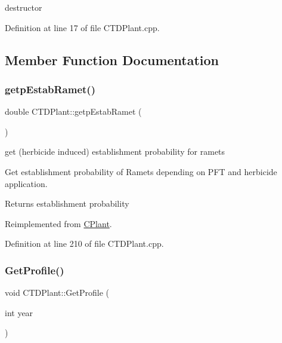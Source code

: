 destructor 

Definition at line 17 of file C\+T\+D\+Plant.\+cpp.



\subsection{Member Function Documentation}
\mbox{\label{class_c_t_d_plant_a19bab3a7643e23e1bdbf1f3b9a5fdf8b}} 
\subsubsection{\texorpdfstring{getpEstabRamet()}{getpEstabRamet()}}
{\footnotesize\ttfamily double C\+T\+D\+Plant\+::getp\+Estab\+Ramet (\begin{DoxyParamCaption}{ }\end{DoxyParamCaption})\hspace{0.3cm}{\ttfamily [virtual]}}



get (herbicide induced) establishment probability for ramets 

Get establishment probability of Ramets depending on P\+FT and herbicide application. \begin{DoxyReturn}{Returns}
establishment probability 
\end{DoxyReturn}


Reimplemented from \mbox{\hyperlink{class_c_plant_a5ab0a36c3e58898c7c750db485eca653}{C\+Plant}}.



Definition at line 210 of file C\+T\+D\+Plant.\+cpp.

\mbox{\label{class_c_t_d_plant_af5806a71c9d946235d4736ea1a5997fb}} 
\subsubsection{\texorpdfstring{GetProfile()}{GetProfile()}}
{\footnotesize\ttfamily void C\+T\+D\+Plant\+::\+Get\+Profile (\begin{DoxyParamCaption}\item[{int}]{year }\end{DoxyParamCaption})}



